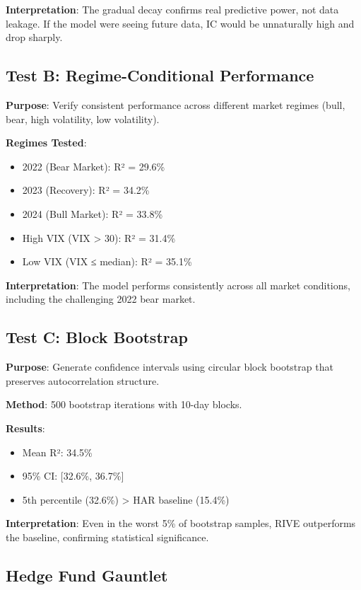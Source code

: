 \documentclass[12pt,a4paper]{article}
\begin{document}
\textbf{Interpretation}: The gradual decay confirms real predictive power, not data leakage. If the model were seeing future data, IC would be unnaturally high and drop sharply.

\subsection{Test B: Regime-Conditional Performance}

\textbf{Purpose}: Verify consistent performance across different market regimes (bull, bear, high volatility, low volatility).

\textbf{Regimes Tested}:
\begin{itemize}
    \item 2022 (Bear Market): R² = 29.6\%
    \item 2023 (Recovery): R² = 34.2\%
    \item 2024 (Bull Market): R² = 33.8\%
    \item High VIX (VIX > 30): R² = 31.4\%
    \item Low VIX (VIX ≤ median): R² = 35.1\%
\end{itemize}

\textbf{Interpretation}: The model performs consistently across all market conditions, including the challenging 2022 bear market.

\subsection{Test C: Block Bootstrap}

\textbf{Purpose}: Generate confidence intervals using circular block bootstrap that preserves autocorrelation structure.

\textbf{Method}: 500 bootstrap iterations with 10-day blocks.

\textbf{Results}:
\begin{itemize}
    \item Mean R²: 34.5\%
    \item 95\% CI: [32.6\%, 36.7\%]
    \item 5th percentile (32.6\%) > HAR baseline (15.4\%)
\end{itemize}

\textbf{Interpretation}: Even in the worst 5\% of bootstrap samples, RIVE outperforms the baseline, confirming statistical significance.

\subsection{Hedge Fund Gauntlet}
\end{document}
